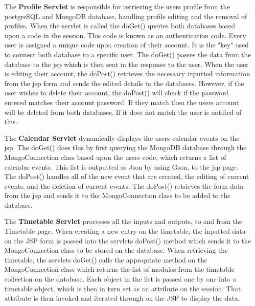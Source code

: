 \par The \textbf{Profile Servlet} is responsible for retrieving the users profile from the postgreSQL and MongoDB database, handling profile editing and the removal of profiles. When the servlet is called the doGet() queries both databases based upon a code in the session. This code is known as an authentication code. Every user is assigned a unique code upon creation of their account. It is the "key" used to connect both database to a specific user. The doGet() passes the data from the database to the jsp which is then sent in the response to the user. When the user is editing their account, the doPost() retrieves the necessary inputted information from the jsp form and sends the edited details to the databases. However, if the user wishes to delete their account, the doPost() will check if the password entered matches their account password. If they match then the users account will be deleted from both databases. If it does not match the user is notified of this.\\

\par The \textbf{Calendar Servlet} dynamically displays the users calendar events on the jsp. The doGet() does this by first querying the MongoDB database through the MongoConnection class based upon the users code, which returns a list of calendar events. This list is outputted as Json by using Gson, to the jsp page. The doPost() handles all of the new event that are created, the editing of current events, and the deletion of current events. The doPost() retrieves the form data from the jsp and sends it to the MongoConnection class to be added to the database.\\

\par The \textbf{Timetable Servlet} processes all the inputs and outputs, to and from the Timetable page. When creating a new entry on the timetable, the inputted data on the JSP form is passed into the servlets doPost() method which sends it to the MongoConnection class to be stored on the database. When retrieving the timetable, the servlets doGet() calls the appropriate method on the MongoConnection class which returns the list of modules from the timetable collection on the database. Each object in the list is passed one by one into a timetable object, which is then in turn set as an attribute on the session. That attribute is then invoked and iterated through on the JSP to display the data.\\


